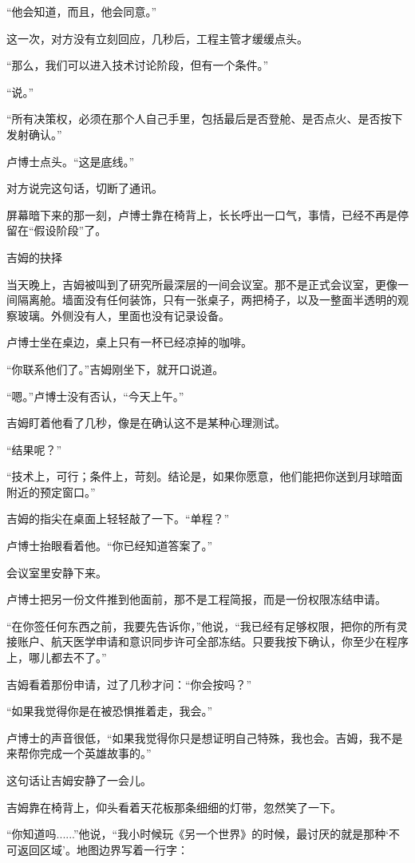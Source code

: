 “他会知道，而且，他会同意。”

这一次，对方没有立刻回应，几秒后，工程主管才缓缓点头。

“那么，我们可以进入技术讨论阶段，但有一个条件。”

“说。”

“所有决策权，必须在那个人自己手里，包括最后是否登舱、是否点火、是否按下发射确认。”

卢博士点头。“这是底线。”

对方说完这句话，切断了通讯。

屏幕暗下来的那一刻，卢博士靠在椅背上，长长呼出一口气，事情，已经不再是停留在“假设阶段”了。

吉姆的抉择

当天晚上，吉姆被叫到了研究所最深层的一间会议室。那不是正式会议室，更像一间隔离舱。墙面没有任何装饰，只有一张桌子，两把椅子，以及一整面半透明的观察玻璃。外侧没有人，里面也没有记录设备。

卢博士坐在桌边，桌上只有一杯已经凉掉的咖啡。

“你联系他们了。”吉姆刚坐下，就开口说道。

“嗯。”卢博士没有否认，“今天上午。”

吉姆盯着他看了几秒，像是在确认这不是某种心理测试。

“结果呢？”

“技术上，可行；条件上，苛刻。结论是，如果你愿意，他们能把你送到月球暗面附近的预定窗口。”

吉姆的指尖在桌面上轻轻敲了一下。“单程？”

卢博士抬眼看着他。“你已经知道答案了。”

会议室里安静下来。

卢博士把另一份文件推到他面前，那不是工程简报，而是一份权限冻结申请。

“在你签任何东西之前，我要先告诉你，”他说，“我已经有足够权限，把你的所有灵接账户、航天医学申请和意识同步许可全部冻结。只要我按下确认，你至少在程序上，哪儿都去不了。”

吉姆看着那份申请，过了几秒才问：“你会按吗？”

“如果我觉得你是在被恐惧推着走，我会。”

卢博士的声音很低，“如果我觉得你只是想证明自己特殊，我也会。吉姆，我不是来帮你完成一个英雄故事的。”

这句话让吉姆安静了一会儿。

吉姆靠在椅背上，仰头看着天花板那条细细的灯带，忽然笑了一下。

“你知道吗......”他说，“我小时候玩《另一个世界》的时候，最讨厌的就是那种‘不可返回区域’。地图边界写着一行字：

